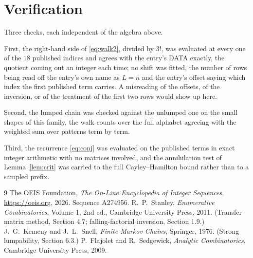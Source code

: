 \documentclass[11pt,a4paper]{article}
\theoremstyle{plain}
\theoremstyle{definition}
\begin{document}
\section{Verification}

Three checks, each independent of the algebra above.

First, the right-hand side of \eqref{eq:walk2}, divided by $3!$, was evaluated at every
one of the $18$ published indices and agrees with the entry's DATA exactly, the quotient
coming out an integer each time; no shift was fitted, the number of rows being read off the
entry's own name as $L=n$ and the entry's offset saying which index the first published
term carries. A misreading of the offsets, of the inversion, or of the treatment of the first
two rows would show up here.

Second, the lumped chain was checked against the unlumped one on the small shapes of this
family, the walk counts over the full alphabet agreeing with the weighted sum over patterns
term by term.

Third, the recurrence \eqref{eq:conj} was evaluated on the published terms in exact integer
arithmetic with no matrices involved, and the annihilation test of Lemma~\ref{lem:crit} was
carried to the full Cayley--Hamilton bound rather than to a sampled prefix.

\begin{thebibliography}{9}
 The OEIS Foundation, \emph{The On-Line Encyclopedia of Integer
Sequences}, \url{https://oeis.org}, 2026. Sequence A274956.
 R.~P.~Stanley, \emph{Enumerative Combinatorics}, Volume 1, 2nd ed.,
Cambridge University Press, 2011. (Transfer-matrix method, Section 4.7; falling-factorial
inversion, Section 1.9.)
 J.~G.~Kemeny and J.~L.~Snell, \emph{Finite Markov Chains}, Springer,
1976. (Strong lumpability, Section 6.3.)
 P.~Flajolet and R.~Sedgewick, \emph{Analytic Combinatorics}, Cambridge
University Press, 2009.
\end{thebibliography}
\end{document}
